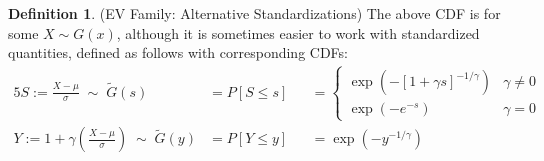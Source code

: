 \documentclass[12pt]{article}
\theoremstyle{plain}
\theoremstyle{definition}
\newtheorem{defn}[thm]{Definition}
\theoremstyle{remark}
\begin{document}
\begin{defn}(EV Family: Alternative Standardizations)
The above CDF is for some $X\sim G(x)$, although it is sometimes easier
to work with standardized quantities, defined as follows with
corresponding CDFs:
\begin{alignat*}{5}
  S :=\frac{X-\mu}{\sigma}
  \;\sim\;
  \tilde{G}(s)
  &=
  P[S\leq s]
  &&=
  \begin{cases}
    \exp\left(
    -\left[1+\gamma s\right]^{-1/\gamma}
    \right)
    & \gamma\neq 0
    \\
    \exp\left(
    -e^{-s}
    \right)
    & \gamma =0
  \end{cases}
  \\
  Y :=1+\gamma\left(\frac{X-\mu}{\sigma}\right)
  \;\sim\;
  \tilde{G}(y)
  &=
  P[Y\leq y]
  &&=
  \exp\left(
  -y^{-1/\gamma}
  \right)
\end{alignat*}
\end{defn}
\end{document}

